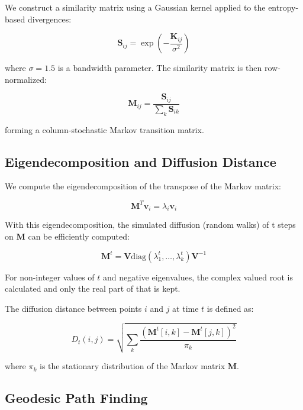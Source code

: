 \documentclass[12pt,a4paper]{article}
\begin{document}
We construct a similarity matrix using a Gaussian kernel applied to the entropy-based divergences:

\begin{equation}
\mathbf{S}_{ij} = \exp\left(-\frac{\mathbf{K}_{ij}}{\sigma^2}\right)
\end{equation}

where $\sigma = 1.5$ is a bandwidth parameter. The similarity matrix is then row-normalized:

\begin{equation}
\mathbf{M}_{ij} = \frac{\mathbf{S}_{ij}}{\sum_{k} \mathbf{S}_{ik}}
\end{equation}

forming a column-stochastic Markov transition matrix.

\subsection{Eigendecomposition and Diffusion Distance}

We compute the eigendecomposition of the transpose of the Markov matrix:

\begin{equation}
\mathbf{M}^T \mathbf{v}_i = \lambda_i \mathbf{v}_i
\end{equation}

With this eigendecomposition, the simulated diffusion (random walks) of t steps on $\mathbf{M}$ can be efficiently computed:

\begin{equation}
\mathbf{M}^t = \mathbf{V} \text{diag}(\lambda_1^t, \ldots, \lambda_k^t) \mathbf{V}^{-1}
\end{equation}

For non-integer values of $t$ and negative eigenvalues, the complex valued root is calculated and only the real part of that is kept.

The diffusion distance between points $i$ and $j$ at time $t$ is defined as:

\begin{equation}
D_t(i,j) = \sqrt{\sum_{k} \frac{(\mathbf{M}^t[i,k] - \mathbf{M}^t[j,k])^2}{\pi_k}}
\end{equation}

where $\pi_k$ is the stationary distribution of the Markov matrix $\mathbf{M}$.

\subsection{Geodesic Path Finding}
\end{document}
